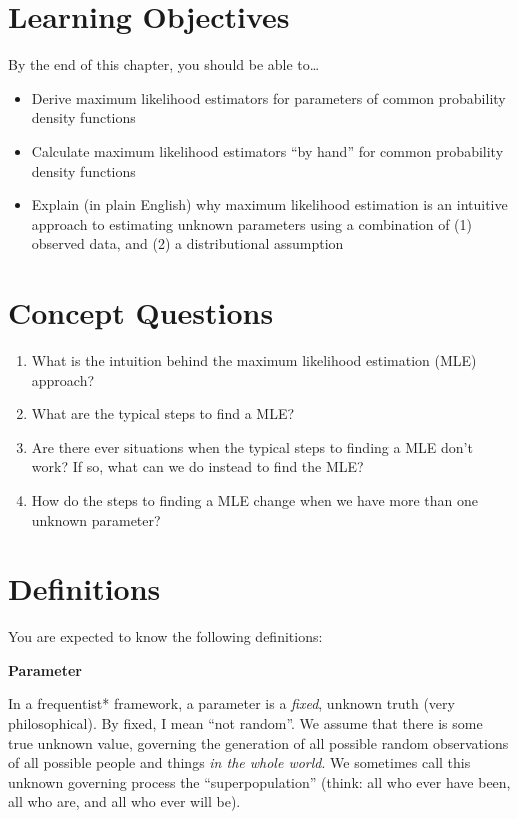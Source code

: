 \documentclass[
  letterpaper,
  DIV=11,
  numbers=noendperiod]{scrreprt}
\begin{document}
\section{Learning Objectives}\label{learning-objectives-1}

By the end of this chapter, you should be able to\ldots{}

\begin{itemize}
\item
  Derive maximum likelihood estimators for parameters of common
  probability density functions
\item
  Calculate maximum likelihood estimators ``by hand'' for common
  probability density functions
\item
  Explain (in plain English) why maximum likelihood estimation is an
  intuitive approach to estimating unknown parameters using a
  combination of (1) observed data, and (2) a distributional assumption
\end{itemize}

\section{Concept Questions}\label{concept-questions-1}

\begin{enumerate}
\def\labelenumi{\arabic{enumi}.}
\item
  What is the intuition behind the maximum likelihood estimation (MLE)
  approach?
\item
  What are the typical steps to find a MLE?
\item
  Are there ever situations when the typical steps to finding a MLE
  don't work? If so, what can we do instead to find the MLE?
\item
  How do the steps to finding a MLE change when we have more than one
  unknown parameter?
\end{enumerate}

\section{Definitions}\label{definitions-1}

You are expected to know the following definitions:

\textbf{Parameter}

In a frequentist* framework, a parameter is a \emph{fixed}, unknown
truth (very philosophical). By fixed, I mean ``not random''. We assume
that there is some true unknown value, governing the generation of all
possible random observations of all possible people and things \emph{in
the whole world}. We sometimes call this unknown governing process the
``superpopulation'' (think: all who ever have been, all who are, and all
who ever will be).
\end{document}
